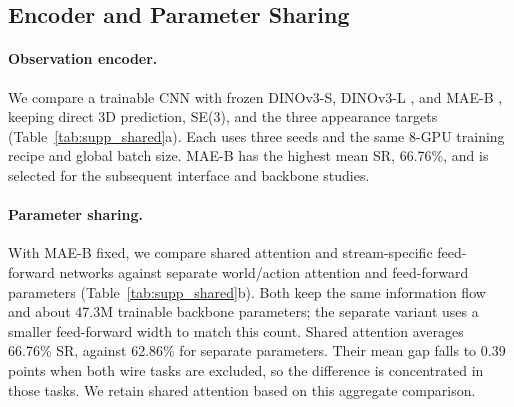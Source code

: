 \subsection{Encoder and Parameter Sharing}
\label{app:design_shared}


\paragraph{Observation encoder.}
We compare a trainable CNN with frozen DINOv3-S, DINOv3-L \cite{dinov3}, and MAE-B
\cite{mae}, keeping direct 3D prediction, SE(3), and the three appearance targets
(Table~\ref{tab:supp_shared}a). Each uses three seeds and the same 8-GPU training
recipe and global batch size. MAE-B has the highest mean SR, 66.76\%, and is selected
for the subsequent interface and backbone studies.

\paragraph{Parameter sharing.}
With MAE-B fixed, we compare shared attention and stream-specific feed-forward
networks against separate world/action attention and feed-forward parameters
(Table~\ref{tab:supp_shared}b). Both keep the same information flow and about
47.3M trainable backbone parameters; the separate variant uses a smaller
feed-forward width to match this count. Shared attention averages 66.76\% SR,
against 62.86\% for separate parameters. Their mean gap falls to 0.39 points when
both wire tasks are excluded, so the difference is concentrated in those tasks.
We retain shared attention based on this aggregate comparison.
